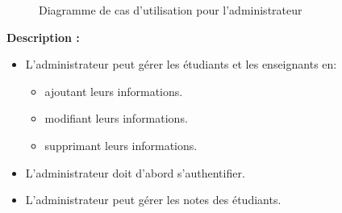 \documentclass[12pt]{report}
\begin{document}
\begin{figure}[h]
\centering
    \centerline{}
    \caption{Diagramme de cas d'utilisation pour l'administrateur}
\end{figure}

\vspace{0.2in}

\textbf{Description :}

\begin{itemize}
    \item L'administrateur peut gérer les étudiants et les enseignants en:
\begin{itemize}
    \item ajoutant leurs informations.
    \item modifiant leurs informations.
    \item supprimant leurs informations.
\end{itemize}
    \item L'administrateur doit d'abord s'authentifier.
    \item L'administrateur peut gérer les notes des étudiants.
\end{itemize}
\end{document}
